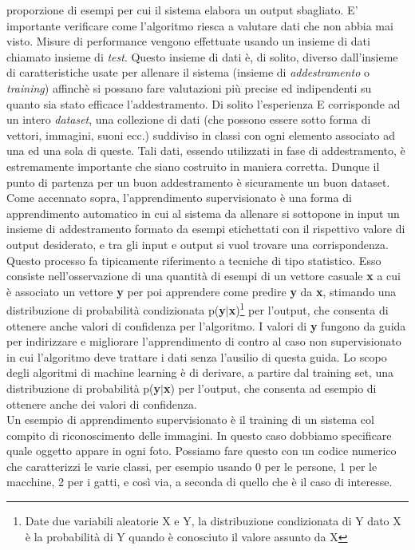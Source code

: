     proporzione di esempi per cui il sistema elabora un output sbagliato.
E’ importante verificare come l’algoritmo riesca a valutare dati che non abbia mai visto.
 Misure di performance vengono effettuate usando un insieme di dati chiamato insieme di \emph{test}.
  Questo insieme di dati è, di solito, diverso dall’insieme di caratteristiche usate per allenare 
  il sistema (insieme di \emph{addestramento} o \emph{training}) affinchè si possano fare valutazioni
   più precise ed indipendenti su quanto sia stato efficace l’addestramento.
Di solito l’esperienza E corrisponde ad un intero \emph{dataset}, una collezione di dati
 (che possono essere sotto forma di vettori, immagini, suoni ecc.) 
 suddiviso in classi con ogni elemento associato ad una ed una sola di queste. Tali dati, essendo utilizzati
  in fase di addestramento, è estremamente importante che siano costruito in maniera corretta.
  Dunque il punto di partenza per un buon addestramento è sicuramente un buon dataset.
 \\
 
Come accennato sopra, l’apprendimento supervisionato è una forma di apprendimento automatico
 in cui al sistema da allenare si sottopone in input un insieme di addestramento formato da esempi
  etichettati con il rispettivo valore di output desiderato, e tra gli input e output si vuol trovare una corrispondenza.
   Questo processo fa tipicamente 
  riferimento a tecniche
  di tipo statistico.
Esso consiste nell’osservazione di una quantità di esempi di un vettore casuale 
\textbf{x} a cui è associato un vettore \textbf{y}  per poi apprendere come predire \textbf{y} 
da \textbf{x}, 
stimando una distribuzione
 di probabilità condizionata p(\textbf{y}$\mid$\textbf{x})\footnote{Date due variabili aleatorie X e Y,
  la distribuzione condizionata di Y dato X è la probabilità di Y quando è conosciuto il valore 
  assunto da X} per l'output, che consenta di ottenere anche valori di 
 confidenza per l'algoritmo. I valori di \textbf{y} fungono da guida per indirizzare e migliorare 
 l’apprendimento di contro al caso non supervisionato in cui l’algoritmo deve trattare i dati 
 senza l’ausilio di questa guida. 
 Lo scopo degli algoritmi di machine learning è di derivare, a partire dal training set, una distribuzione
  di probabilità p(\textbf{y}$\mid$\textbf{x}) per l’output, che consenta ad esempio di ottenere
anche dei valori di confidenza. \\
Un esempio di apprendimento supervisionato è  il training di un sistema
col compito di riconoscimento delle immagini.
In questo caso dobbiamo specificare quale oggetto appare in ogni foto.
Possiamo fare questo con un codice numerico che caratterizzi le varie classi, per esempio
usando 0 per le persone, 1 per le macchine, 2 per i gatti, e così via, a seconda di quello che
 è il caso di interesse.\\


